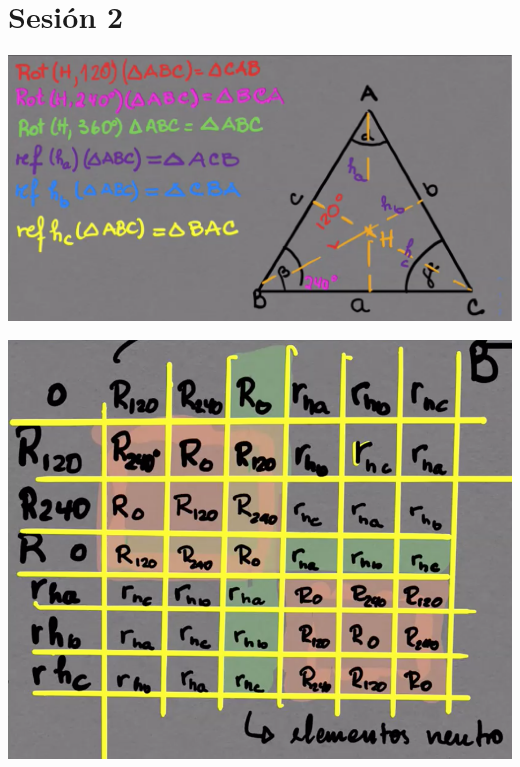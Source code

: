 \section{Sesión 2}

\begin{center}
	\includegraphics[scale=0.4]{images/Sesion2/1}
\end{center}

\begin{center}
	\includegraphics[scale=0.4]{images/Sesion2/2}
\end{center}


